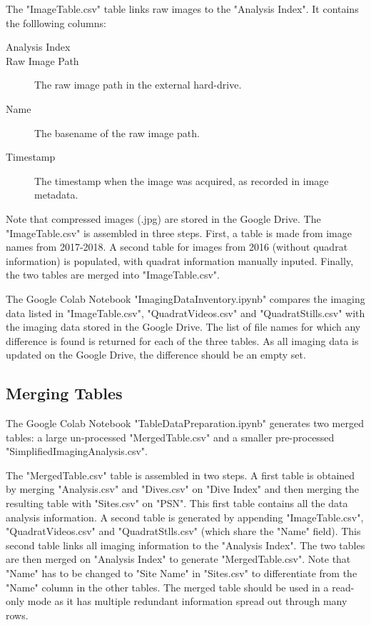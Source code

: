 \documentclass[11pt]{article} %
\begin{document}
The "ImageTable.csv" table links raw images to the "Analysis Index". It contains the folllowing columns:
\begin{description}
\item[Analysis Index] 
\item[Raw Image Path] The raw image path in the external hard-drive.
\item[Name] The basename of the raw image path.
\item[Timestamp] The timestamp when the image was acquired, as recorded in image metadata.
\end{description}
Note that compressed images (.jpg) are stored in the Google Drive. The "ImageTable.csv" is assembled in three steps. First, a table is made from image names from 2017-2018. A second table for images from 2016 (without quadrat information) is populated, with quadrat information manually inputed. Finally, the two tables are merged into "ImageTable.csv".

The Google Colab Notebook "ImagingDataInventory.ipynb" compares the imaging data listed in "ImageTable.csv", "QuadratVideos.csv" and "QuadratStills.csv" with the imaging data stored in the Google Drive. The list of file names for which any difference is found is returned for each of the three tables. As all imaging data is updated on the Google Drive, the difference should be an empty set.


\subsection{Merging Tables}

The Google Colab Notebook "TableDataPreparation.ipynb" generates two merged tables: a large un-processed "MergedTable.csv" and a smaller pre-processed "SimplifiedImagingAnalysis.csv". 

The "MergedTable.csv" table is assembled in two steps. A first table is obtained by merging "Analysis.csv" and "Dives.csv" on "Dive Index" and then merging the resulting table with "Sites.csv" on "PSN". This first table contains all the data analysis information. A second table is generated by appending "ImageTable.csv", "QuadratVideos.csv" and "QuadratStlls.csv" (which share the "Name" field). This second table links all imaging information to the "Analysis Index". The two tables are then merged on "Analysis Index"  to generate "MergedTable.csv". Note that "Name" has to be changed to "Site Name" in "Sites.csv" to differentiate from the "Name" column in the other tables. The merged table should be used in a read-only mode as it has multiple redundant information spread out through many rows.
\end{document}
